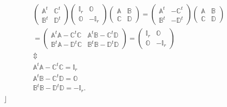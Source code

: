 \documentclass[aps,preprint]{revtex4}
\begin{document}
\begin{gather}
\left( 
\begin{array}{cc}
\mathbb{A}^{t} & \mathbb{C}^{t} \\ 
\mathbb{B}^{t} & \mathbb{D}^{t}%
\end{array}
\right) \left( 
\begin{array}{cc}
\mathbb{I}_{r} & \mathbb{O} \\ 
\mathbb{O} & -\mathbb{I}_{r}%
\end{array}
\right) \left( 
\begin{array}{cc}
\mathbb{A} & \mathbb{B} \\ 
\mathbb{C} & \mathbb{D}%
\end{array}
\right) =\left( 
\begin{array}{cc}
\mathbb{A}^{t} & -\mathbb{C}^{t} \\ 
\mathbb{B}^{t} & -\mathbb{D}^{t}%
\end{array}
\right) \left( 
\begin{array}{cc}
\mathbb{A} & \mathbb{B} \\ 
\mathbb{C} & \mathbb{D}%
\end{array}
\right) \\
=\left( 
\begin{array}{cc}
\mathbb{A}^{t}\mathbb{A-C}^{t}\mathbb{C} & \mathbb{A}^{t}\mathbb{B-C}^{t}%
\mathbb{D} \\ 
\mathbb{B}^{t}\mathbb{A-D}^{t}\mathbb{C} & \mathbb{B}^{t}\mathbb{B-D}^{t}%
\mathbb{D}%
\end{array}
\right) =\left( 
\begin{array}{cc}
\mathbb{I}_{r} & \mathbb{O} \\ 
\mathbb{O} & -\mathbb{I}_{r}%
\end{array}
\right) \\
\Updownarrow \\
\mathbb{A}^{t}\mathbb{A-C}^{t}\mathbb{C=I}_{r} \\
\mathbb{A}^{t}\mathbb{B-C}^{t}\mathbb{D=O} \\
\mathbb{B}^{t}\mathbb{B-D}^{t}\mathbb{D=-I}_{r}.
\end{gather}
$\rfloor$%
\end{document}
